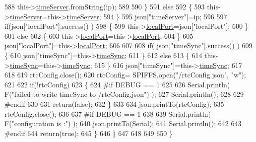 \begin{DoxyCode}
588                 this->\hyperlink{class_cool_time_ad2b9858f399108cb440dd1e908916f04}{timeServer}.fromString(ip);
589                 
590             \}
591             \textcolor{keywordflow}{else}
592             \{
593                 this->\hyperlink{class_cool_time_ad2b9858f399108cb440dd1e908916f04}{timeServer}=this->\hyperlink{class_cool_time_ad2b9858f399108cb440dd1e908916f04}{timeServer};
594             \}
595             json[\textcolor{stringliteral}{"timeServer"}]=ip;
596             
597             \textcolor{keywordflow}{if}(json[\textcolor{stringliteral}{"localPort"}].success() )
598             \{                       
599                 this->\hyperlink{class_cool_time_a2f777da44d7ba678be8185299e9b49d1}{localPort}=json[\textcolor{stringliteral}{"localPort"}];
600             \}
601             \textcolor{keywordflow}{else}
602             \{
603                 this->\hyperlink{class_cool_time_a2f777da44d7ba678be8185299e9b49d1}{localPort}=this->\hyperlink{class_cool_time_a2f777da44d7ba678be8185299e9b49d1}{localPort};
604             \}
605             json[\textcolor{stringliteral}{"localPort"}]=this->\hyperlink{class_cool_time_a2f777da44d7ba678be8185299e9b49d1}{localPort};
606 
607 
608             \textcolor{keywordflow}{if}( json[\textcolor{stringliteral}{"timeSync"}].success() )
609             \{
610                 json[\textcolor{stringliteral}{"timeSync"}]=this->\hyperlink{class_cool_time_a9d032e76c3470a15b3bbbc52af6463f7}{timeSync};
611             \}
612             \textcolor{keywordflow}{else}
613             \{
614                 this->\hyperlink{class_cool_time_a9d032e76c3470a15b3bbbc52af6463f7}{timeSync}=this->\hyperlink{class_cool_time_a9d032e76c3470a15b3bbbc52af6463f7}{timeSync};
615             \}
616             json[\textcolor{stringliteral}{"timeSync"}]=this->\hyperlink{class_cool_time_a9d032e76c3470a15b3bbbc52af6463f7}{timeSync};
617 
618 
619             rtcConfig.close();
620             rtcConfig= SPIFFS.open(\textcolor{stringliteral}{"/rtcConfig.json"}, \textcolor{stringliteral}{"w"});
621             
622             \textcolor{keywordflow}{if}(!rtcConfig)
623             \{
624 \textcolor{preprocessor}{            #if DEBUG == 1}
625 
626                 Serial.println( F(\textcolor{stringliteral}{"failed to write timeSync to /rtcConfig.json"}) );
627                 Serial.println();
628             
629 \textcolor{preprocessor}{            #endif}
630 
631                 \textcolor{keywordflow}{return}(\textcolor{keyword}{false});
632             \}
633             
634             json.printTo(rtcConfig);
635             rtcConfig.close();
636     
637 \textcolor{preprocessor}{        #if DEBUG == 1}
638 
639             Serial.println( F(\textcolor{stringliteral}{"configuration is :"}) );
640             json.printTo(Serial);
641             Serial.println();
642         
643 \textcolor{preprocessor}{        #endif}
644             \textcolor{keywordflow}{return}(\textcolor{keyword}{true}); 
645         \}
646     \}   
647 
648 
649 
650 \}
\end{DoxyCode}

